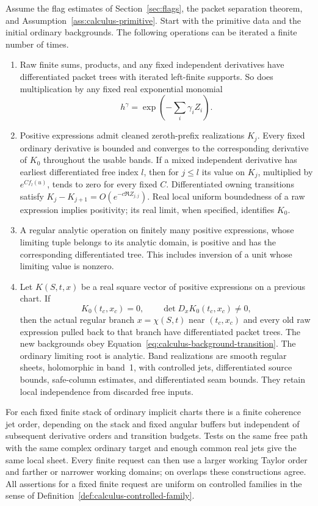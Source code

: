 \begin{theorem}
\label{thm:calculus}
Assume the flag estimates of Section~\ref{sec:flags}, the packet separation
theorem, and Assumption~\ref{ass:calculus-primitive}.  Start with the primitive
data and the initial ordinary backgrounds.  The following operations can be
iterated a finite number of times.
\begin{enumerate}
\item Raw finite sums, products, and any fixed independent derivatives have
differentiated packet trees with iterated left-finite supports.  So does
multiplication by any fixed real exponential monomial
\[
 h^\gamma=\exp\left(-\sum_i\gamma_i Z_i\right).
\]
\item Positive expressions admit cleaned zeroth-prefix realizations $K_j$.
Every fixed ordinary derivative is bounded and converges to the corresponding
derivative of $K_0$ throughout the usable bands.  If a mixed independent
derivative has earliest differentiated free index $l$, then for $j\le l$
its value on $K_j$, multiplied by $e^{C f_l(u)}$, tends to zero for every
fixed $C$.  Differentiated owning transitions satisfy
$K_j-K_{j+1}=O(e^{-c\Re Z_{j,j}})$.  Real local uniform boundedness of a raw
expression implies positivity; its real limit, when specified, identifies
$K_0$.
\item A regular analytic operation on finitely many positive expressions,
whose limiting tuple belongs to its analytic domain, is positive and has
the corresponding differentiated tree.  This includes inversion of a unit
whose limiting value is nonzero.
\item Let $K(S,t,x)$ be a real square vector of positive expressions on a
previous chart.  If
\[
 K_0(t_c,x_c)=0,\qquad \det D_xK_0(t_c,x_c)\ne0,
\]
then the actual regular branch $x=\chi(S,t)$ near $(t_c,x_c)$ and every old
raw expression pulled back to that branch have differentiated packet trees.
The new backgrounds obey Equation~\eqref{eq:calculus-background-transition}.
The ordinary limiting root is analytic.  Band realizations are smooth
regular sheets, holomorphic in band~1, with controlled jets, differentiated
source bounds, safe-column estimates, and differentiated seam bounds.
They retain local independence from discarded free inputs.
\end{enumerate}
For each fixed finite stack of ordinary implicit charts there is a finite
coherence jet order, depending on the stack and fixed angular buffers but
independent of subsequent derivative orders and transition budgets.
Tests on the same free path with the same complex ordinary target and enough
common real jets give the same local sheet.  Every finite request can then
use a larger working Taylor order and farther or narrower working domains;
on overlaps these constructions agree.  All assertions for a fixed finite
request are uniform on controlled families in the sense of
Definition~\ref{def:calculus-controlled-family}.


\end{theorem}
